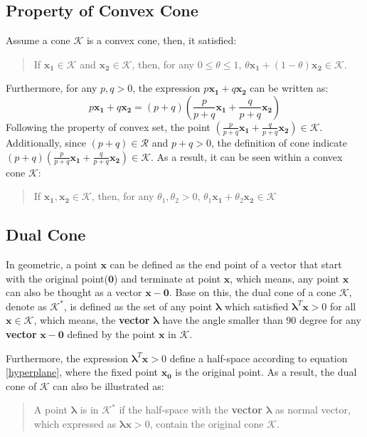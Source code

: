 \documentclass[10pt,a4paper]{article}
\begin{document}
\subsection{Property of Convex Cone}
Assume a cone $\mathcal{K}$ is a convex cone, then, it satisfied:
\begin{quote}
	If $\mathbf{x_{1}} \in \mathcal{K}$ and $\mathbf{x_{2}} \in \mathcal{K}$, then, for any $0 \leq \theta \leq 1$, $\theta \mathbf{x_{1}} + (1 - \theta) \mathbf{x_{2}} \in \mathcal{K}$.
\end{quote}
Furthermore, for any $p, q > 0$, the expression $p \mathbf{x_{1}} + q \mathbf{x_{2}}$ can be written as:
\begin{equation}
	p \mathbf{x_{1}} + q \mathbf{x_{2}} = (p + q) (\frac{p}{p + q} \mathbf{x_{1}} + \frac{q}{p + q} \mathbf{x_{2}})
\end{equation}
Following the property of convex set, the point $(\frac{p}{p + q} \mathbf{x_{1}} + \frac{q}{p + q} \mathbf{x_{2}}) \in \mathcal{K}$. Additionally, since $(p + q) \in \mathcal{R}$ and $p + q > 0$, the definition of cone indicate $(p + q) (\frac{p}{p + q} \mathbf{x_{1}} + \frac{q}{p + q} \mathbf{x_{2}}) \in \mathcal{K}$. As a result, it can be seen within a convex cone $\mathcal{K}$:
\begin{quote}
	If $\mathbf{x_{1}}, \mathbf{x_{2}} \in \mathcal{K}$, then, for any $\theta_{1}, \theta_{2} > 0$, $\theta_{1} \mathbf{x_{1}} + \theta_{2} \mathbf{x_{2}} \in \mathcal{K}$
\end{quote}

\subsection{Dual Cone}
In geometric, a point $\mathbf{x}$ can be defined as the end point of a vector that start with the original point($\mathbf{0}$) and terminate at point $\mathbf{x}$, which means, any point $\mathbf{x}$ can also be thought as a vector $\mathbf{x} - \mathbf{0}$. Base on this, the dual cone of a cone $\mathcal{K}$, denote as $\mathcal{K}^{*}$, is defined as the set of any point $\mathbf{\lambda}$ which satisfied $\mathbf{\lambda}^{T} \mathbf{x} > 0$ for all $\mathbf{x} \in \mathcal{K}$, which means, the \textbf{vector} $\mathbf{\lambda} $ have the angle smaller than 90 degree for any \textbf{vector} $\mathbf{x} - \mathbf{0}$ defined by the point $\mathbf{x}$ in $\mathcal{K}$. 

Furthermore, the expression $\mathbf{\lambda}^{T} \mathbf{x} > 0$ define a half-space according to equation \ref{hyperplane}, where the fixed point $\mathbf{x_{0}}$ is the original point. As a result, the dual cone of $\mathcal{K}$ can also be illustrated as:
\begin{quote}
	A point $\mathbf{\lambda}$ is in $\mathcal{K}^{*}$ if the half-space with the \textbf{vector} $\mathbf{\lambda}$ as normal vector, which expressed as $\mathbf{\lambda}\mathbf{x} > 0$, contain the original cone $\mathcal{K}$.
\end{quote}
\end{document}
